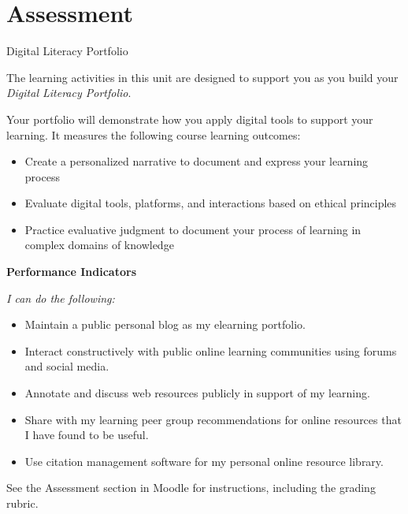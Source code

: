 \documentclass[
]{book}
\providecommand{\tightlist}{%
  \setlength{\itemsep}{0pt}\setlength{\parskip}{0pt}}
\theoremstyle{definition}
\theoremstyle{definition}
\theoremstyle{definition}
\theoremstyle{definition}
\theoremstyle{remark}
\begin{document}
\hypertarget{assessment-2}{%
\section*{Assessment}\label{assessment-2}}

\begin{assessment}
{Digital Literacy Portfolio}

The learning activities in this unit are designed to support you as you build your \emph{Digital Literacy Portfolio}.

Your portfolio will demonstrate how you apply digital tools to support your learning. It measures the following course learning outcomes:

\begin{itemize}
\tightlist
\item
  Create a personalized narrative to document and express your learning process\\
\item
  Evaluate digital tools, platforms, and interactions based on ethical principles\\
\item
  Practice evaluative judgment to document your process of learning in complex domains of knowledge
\end{itemize}

\textbf{Performance Indicators}

\emph{I can do the following:}

\begin{itemize}
\tightlist
\item
  Maintain a public personal blog as my elearning portfolio.\\
\item
  Interact constructively with public online learning communities using forums and social media.\\
\item
  Annotate and discuss web resources publicly in support of my learning.\\
\item
  Share with my learning peer group recommendations for online resources that I have found to be useful.\\
\item
  Use citation management software for my personal online resource library.
\end{itemize}

See the Assessment section in Moodle for instructions, including the grading rubric.
\end{assessment}
\end{document}
